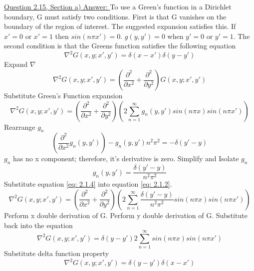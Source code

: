 \documentclass[12pt]{article}
\begin{document}
    \underline{Question 2.15, Section a) Answer: }
    \newline To use a Green's function in a Dirichlet boundary, G must satisfy two conditions.
    \newline First is that G vanishes on the boundary of the region of interest. The suggested expansion satisfies this. If $x'=0$ or $x'=1$ then $sin(n\pi x')=0$. $g(y,y') = 0$ when $y'=0$ or $y'=1$.
    \newline The second condition is that the Greens function satisfies the following equation
    \begin{equation} \label{eq: }
        \nabla^2 G(x,y;x',y') = \delta(x-x') \delta(y-y')
    \end{equation}
    Expand $\nabla$
    \begin{equation} \label{eq: 2.1.1}
        \nabla^2 G(x,y;x',y')= \left(\frac{\partial^2}{\partial x^2} + \frac{\partial^2}{\partial y^2} \right) G(x,y;x',y')
    \end{equation}
    Substitute Green's Function expansion
    \begin{equation} \label{eq: 2.1.2}
        \nabla^2 G(x,y;x',y') = \left(\frac{\partial^2}{\partial x^2} + \frac{\partial^2}{\partial y^2} \right) \left(2 \sum_{n=1}^\infty g_n(y,y') sin(n \pi x) sin(n \pi x') \right)
    \end{equation}
    Rearrange $g_n$
    \begin{equation} \label{eq: 2.1.3}
        \left(\frac{\partial^2}{\partial x^2} g_n(y,y') \right) - g_n(y,y') n^2 \pi^2 = -\delta(y'-y)
    \end{equation}
    $g_n$ has no x component; therefore, it's derivative is zero. Simplify and Isolate $g_n$
    \begin{equation} \label{eq: 2.1.4}
        g_n(y,y') = \frac{\delta(y'-y)}{n^2 \pi^2}
    \end{equation}
    Substitute equation \ref{eq: 2.1.4} into equation \ref{eq: 2.1.2}. 
    \begin{equation} \label{eq: 2.1.5}
        \nabla^2 G(x,y;x',y') = \left(\frac{\partial^2}{\partial x^2} + \frac{\partial^2}{\partial y^2} \right) \left(2 \sum_{n=1}^\infty \frac{\delta(y'-y)}{n^2 \pi^2} sin(n \pi x) sin(n \pi x') \right)
    \end{equation}    
    Perform x double derivation of G. Perform y double derivation of G. Substitute back into the equation
    \begin{equation} \label{eq: 2.1.6}
        \nabla^2 G(x,y;x',y') = \delta(y-y') 2 \sum_{n=1}^\infty sin(n \pi x) sin(n \pi x')
    \end{equation}
    Substitute delta function property
    \begin{equation} \label{eq: 2.1.7}
        \nabla^2 G(x,y;x',y') = \delta(y-y') \delta(x-x')
    \end{equation}
\end{document}
